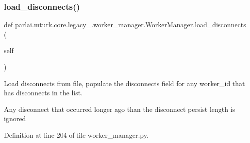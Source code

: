 \mbox{\label{classparlai_1_1mturk_1_1core_1_1legacy__2018_1_1worker__manager_1_1WorkerManager_a1c70337b6be1f18d18fc3b7e3e88c74a}} 
\subsubsection{\texorpdfstring{load\+\_\+disconnects()}{load\_disconnects()}}
{\footnotesize\ttfamily def parlai.\+mturk.\+core.\+legacy\+\_.\+worker\+\_\+manager.\+Worker\+Manager.\+load\+\_\+disconnects (\begin{DoxyParamCaption}\item[{}]{self }\end{DoxyParamCaption})}

\begin{DoxyVerb}Load disconnects from file, populate the disconnects field for any worker_id
that has disconnects in the list.

Any disconnect that occurred longer ago than the disconnect persist length is
ignored
\end{DoxyVerb}
 

Definition at line 204 of file worker\+\_\+manager.\+py.


